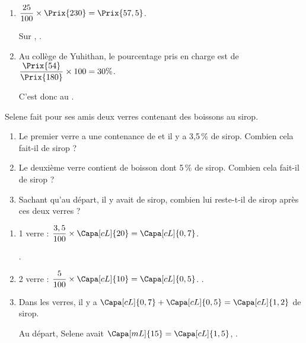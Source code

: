 \begin{Maquette}[Fiche,CorrigeFin,Colonnes=2]{}
\begin{multicols}{2}
      \begin{Solution}
         \begin{enumerate}
            \item $\dfrac{25}{100}\times\Prix{230} =\Prix{57,5}$. \par \smallskip
               Sur , .
            \item Au collège de Yuhithan, le pourcentage pris en charge est de $\dfrac{\Prix{54}}{\Prix{180}}\times100 =30\%$. \par C'est donc au .
         \end{enumerate}
      \end{Solution}
      
      
      \begin{exercice} %
         Selene fait pour ses amis deux verres contenant des boissons au sirop.
            \begin{enumerate}
               \item Le premier verre a une contenance de  et il y a 3,5\,\% de sirop. Combien cela fait-il de sirop ?
               \item Le deuxième verre contient  de boisson dont 5\,\% de sirop. Combien cela fait-il de sirop ?
               \item Sachant qu'au départ, il y avait  de sirop, combien lui reste-t-il de sirop après ces deux verres ?
            \end{enumerate}
      \end{exercice}
         
      \begin{Solution}
         \begin{enumerate}
            \item 1 verre : $\dfrac{3,5}{100}\times\Capa[cL]{20} =\Capa[cL]{0,7}$. \par
               .
            \item 2 verre : $\dfrac{5}{100}\times\Capa[cL]{10} =\Capa[cL]{0,5}$.
               .
            \item Dans les verres, il y a $\Capa[cL]{0,7}+\Capa[cL]{0,5} =\Capa[cL]{1,2}$ de sirop. \par
               Au départ, Selene avait $\Capa[mL]{15} = \Capa[cL]{1,5}$, .
         \end{enumerate}
      \end{Solution}
      

\end{multicols}
\end{Maquette}
